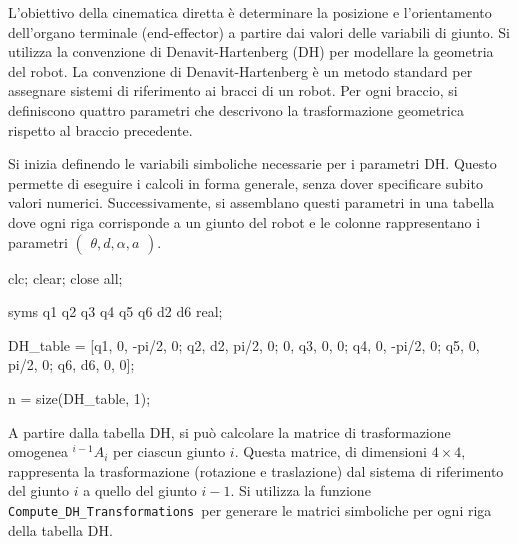 \documentclass[11pt, a4paper]{article}
\begin{document}

\begin{par}
\begin{flushleft}
L'obiettivo della cinematica diretta è determinare la posizione e l'orientamento dell'organo terminale (end-effector) a partire dai valori delle variabili di giunto. Si utilizza la convenzione di Denavit-Hartenberg (DH) per modellare la geometria del robot. La convenzione di Denavit-Hartenberg è un metodo standard per assegnare sistemi di riferimento ai bracci di un robot. Per ogni braccio, si definiscono quattro parametri che descrivono la trasformazione geometrica rispetto al braccio precedente.
\end{flushleft}
\end{par}

\begin{par}
\begin{flushleft}
Si inizia definendo le variabili simboliche necessarie per i parametri DH. Questo permette di eseguire i calcoli in forma generale, senza dover specificare subito valori numerici. Successivamente, si assemblano questi parametri in una tabella dove ogni riga corrisponde a un giunto del robot e le colonne rappresentano i parametri $\left(\begin{array}{c}
\theta ,d,\alpha ,a
\end{array}\right)$.
\end{flushleft}
\end{par}

\begin{matlabcode}
clc;
clear;
close all;

syms q1 q2 q3 q4 q5 q6 d2 d6 real;

DH_table = [q1, 0, -pi/2, 0;    %
            q2, d2, pi/2, 0;    %
            0, q3, 0, 0;        %
            q4, 0, -pi/2, 0;    %
            q5, 0, pi/2, 0;     %
            q6, d6, 0, 0];      %

n = size(DH_table, 1);
\end{matlabcode}

\begin{par}
\begin{flushleft}
A partire dalla tabella DH, si può calcolare la matrice di trasformazione omogenea $^{i-1} A_i$ per ciascun giunto $i$. Questa matrice, di dimensioni $4\times 4$, rappresenta la trasformazione (rotazione e traslazione) dal sistema di riferimento del giunto $i$ a quello del giunto $i-1$. Si utilizza la funzione \texttt{Compute\_DH\_Transformations }per generare le matrici simboliche per ogni riga della tabella DH.
\end{flushleft}
\end{par}
\end{document}
